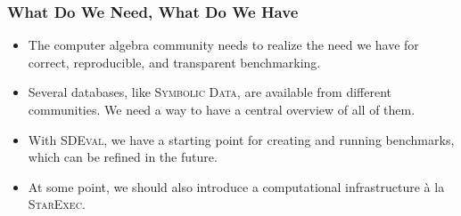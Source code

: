 \documentclass{beamer}
\begin{document}
\begin{frame}
\frametitle{What Do We Need, What Do We Have}
\begin{itemize}
\item The computer algebra community needs to realize the need we have
  for correct, reproducible, and transparent benchmarking.
\item Several databases, like \textsc{Symbolic Data}, are available
  from different communities. We need a way to have a central overview
  of all of them.
\item With \textsc{SDEval}, we have a starting point for creating and
  running benchmarks, which can be
  refined in the future.
\item At some point, we should also introduce a computational
  infrastructure \`{a} la \textsc{StarExec}.
\end{itemize}
\end{frame}

% 
\end{document}
